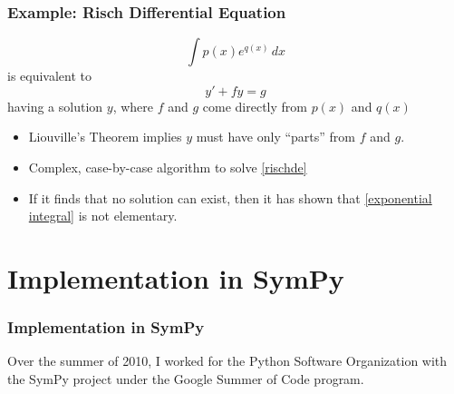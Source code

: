 \documentclass{beamer}
\numberwithin{equation}{section} %
\begin{document}
\begin{frame}
    \frametitle{Example: Risch Differential Equation}
    \pause
    \begin{equation}
    \label{exponential integral}
    \int{p(x)e^{q(x)}\,dx}
    \end{equation}
    is equivalent to 
    \begin{equation}
    \label{rischde}
    y' + fy = g
    \end{equation}
    having a solution $y$, where $f$ and $g$ come directly from $p(x)$
    and $q(x)$
    \pause
    \begin{itemize}
        \item Liouville's Theorem implies $y$ must have only ``parts''
        from $f$ and $g$.
        \pause
        \item Complex, case-by-case algorithm to solve \ref{rischde}
        \pause
        \item If it finds that no solution can exist, then it has shown
        that \ref{exponential integral} is not elementary.
    \end{itemize}
\end{frame}

\section{Implementation in SymPy}

\begin{frame}
    \frametitle{Implementation in SymPy}
    \begin{figure}
   \end{figure}
    Over the summer of 2010, I worked for the Python Software
    Organization with the SymPy project under the Google Summer of Code
    program.
\end{frame}
\end{document}
